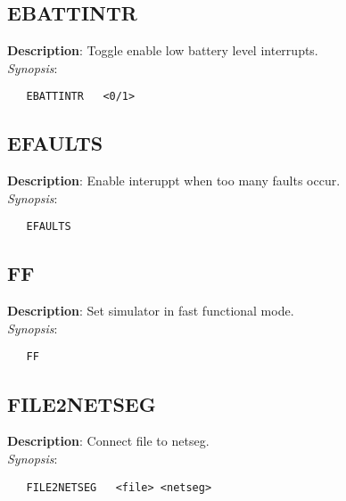\subsection{\bf EBATTINTR}
\label{manpages:EBATTINTR}
\label{manpages:ebattintr}
\vspace{-0.2in}
{\bf Description}: 	Toggle enable low battery level interrupts.\\[1.5ex]
{\em Synopsis}:
\vspace{-0.2in}
\scriptsize
\begin{verbatim}
   EBATTINTR   <0/1>			
\end{verbatim}
\normalsize
\vspace{-0.2in}


\subsection{\bf EFAULTS}
\label{manpages:EFAULTS}
\label{manpages:efaults}
\vspace{-0.2in}
{\bf Description}: 	Enable interuppt when too many faults occur.\\[1.5ex]
{\em Synopsis}:
\vspace{-0.2in}
\scriptsize
\begin{verbatim}
   EFAULTS   			
\end{verbatim}
\normalsize
\vspace{-0.2in}


\subsection{\bf FF}
\label{manpages:FF}
\label{manpages:ff}
\vspace{-0.2in}
{\bf Description}: 	Set simulator in fast functional mode.\\[1.5ex]
{\em Synopsis}:
\vspace{-0.2in}
\scriptsize
\begin{verbatim}
   FF   				
\end{verbatim}
\normalsize
\vspace{-0.2in}


\subsection{\bf FILE2NETSEG}
\label{manpages:FILE2NETSEG}
\label{manpages:file2netseg}
\vspace{-0.2in}
{\bf Description}: 	Connect file to netseg.\\[1.5ex]
{\em Synopsis}:
\vspace{-0.2in}
\scriptsize
\begin{verbatim}
   FILE2NETSEG   <file>	<netseg>				
\end{verbatim}
\normalsize
\vspace{-0.2in}


